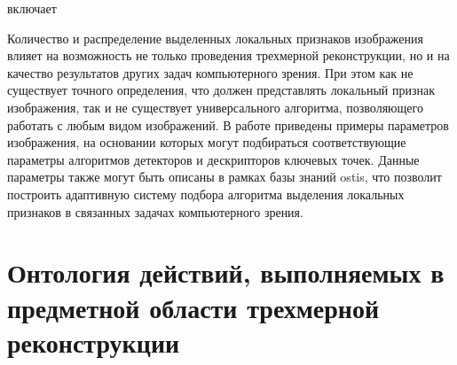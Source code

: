 \begin{SCn}
\begin{scnrelfromset}{включает}
\begin{scnindent}
\begin{scnindent}
                \begin{scnindent}
                \end{scnindent}
                \begin{scnindent}
                \end{scnindent}
            \end{scnindent}
            \begin{scnindent}
            \end{scnindent}
        \end{scnindent}
    \end{scnrelfromset}
\end{SCn}

Количество и распределение выделенных локальных признаков изображения влияет на возможность не только проведения трехмерной реконструкции, но и на качество результатов других задач компьютерного зрения. При этом как не существует точного определения, что должен представлять локальный признак изображения, так и не существует универсального алгоритма, позволяющего работать с любым видом изображений. В работе  приведены примеры параметров изображения, на основании которых могут подбираться соответствующие параметры алгоритмов детекторов и дескрипторов ключевых точек. Данные параметры также могут быть описаны в рамках базы знаний ostis, что позволит построить адаптивную систему подбора алгоритма выделения локальных признаков в связанных задачах компьютерного зрения.

\section{Онтология действий, выполняемых в предметной области трехмерной реконструкции}
\label{sec_3d_models_actions}


